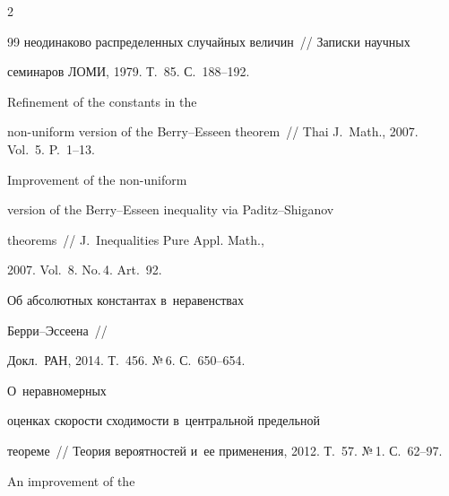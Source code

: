 \begin{multicols}{2}
{{\begin{thebibliography}{99}
неодинаково распределенных случайных величин~// Записки научных


семинаров ЛОМИ, 1979. Т.~85. С.~188--192.







 Refinement of the constants in the


non-uniform version of the Berry--Esseen theorem~// Thai J.~Math., 2007. Vol.~5. P.~1--13.







 Improvement of the non-uniform


version of the Berry--Esseen inequality via Paditz--Shiganov


theorems~// J.~Inequalities Pure  \mbox{Appl.} Math.,


2007. Vol.~8. No.\,4. Art.~92.







 Об абсолютных константах в~неравенствах


Бер\-ри--Эс\-се\-ена~//


Докл.\ РАН, 2014. Т.~456. №\,6. С.~650--654.







 О~неравномерных


оценках ско\-рости схо\-ди\-мости в~цент\-раль\-ной предельной








теореме~// Тео\-рия вероятностей и~ее применения, 2012. Т.~57. №\,1. С.~62--97.





\pagebreak







 An improvement of the



\end{thebibliography}}}
\end{multicols}
